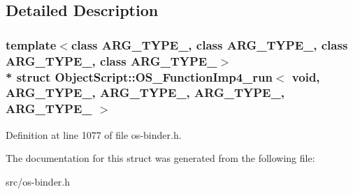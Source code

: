 \subsection{Detailed Description}
\subsubsection*{template$<$class A\+R\+G\+\_\+\+T\+Y\+P\+E\+\_, class A\+R\+G\+\_\+\+T\+Y\+P\+E\+\_, class A\+R\+G\+\_\+\+T\+Y\+P\+E\+\_, class A\+R\+G\+\_\+\+T\+Y\+P\+E\+\_$>$\\*
struct Object\+Script\+::\+O\+S\+\_\+\+Function\+Imp4\+\_\+run$<$ void,   A\+R\+G\+\_\+\+T\+Y\+P\+E\+\_, A\+R\+G\+\_\+\+T\+Y\+P\+E\+\_, A\+R\+G\+\_\+\+T\+Y\+P\+E\+\_, A\+R\+G\+\_\+\+T\+Y\+P\+E\+\_ $>$}



Definition at line 1077 of file os-\/binder.\+h.



The documentation for this struct was generated from the following file\+:\begin{DoxyCompactItemize}
\item 
src/os-\/binder.\+h\end{DoxyCompactItemize}
